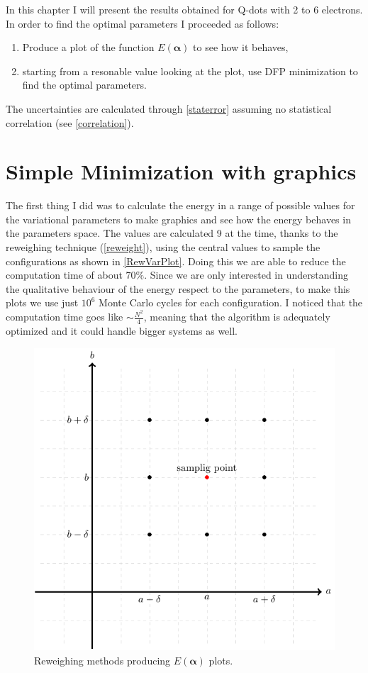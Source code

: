 In this chapter I will present the results obtained for Q-dots with 2 to 6 electrons.
In order to find the optimal parameters I proceeded as follows:
\begin{enumerate}
  \item Produce a plot of the function $E(\bm{\alpha})$ to see how it behaves,
  \item starting from a resonable value looking at the plot, use DFP minimization to find the optimal parameters.
\end{enumerate}
The uncertainties are calculated through \autoref{staterror} assuming no statistical correlation (see \autoref{correlation}).

\section{Simple Minimization with graphics}

The first thing I did was to calculate the energy in a range of possible values for the variational parameters to make graphics and see how the energy behaves in the parameters space.
The values are calculated 9 at the time, thanks to the reweighing technique (\autoref{reweight}), using the central values to sample the configurations as shown in \autoref{RewVarPlot}.
Doing this we are able to reduce the computation time of about $70\%$.
Since we are only interested in understanding the qualitative behaviour of the energy respect to the parameters, to make this plots we use just $10^6$ Monte Carlo cycles for each configuration.
I noticed that the computation time goes like $\sim\frac{N^2}{4}$, meaning that the algorithm is adequately optimized and it could handle bigger systems as well.

\begin{figure}[h]
  \centering
  \includegraphics[width=.5\textwidth]{Schemes/sampling.pdf}
  \caption{Reweighing methods producing $E(\bm{\alpha})$ plots.}
  \label{RewVarPlot}
\end{figure}

